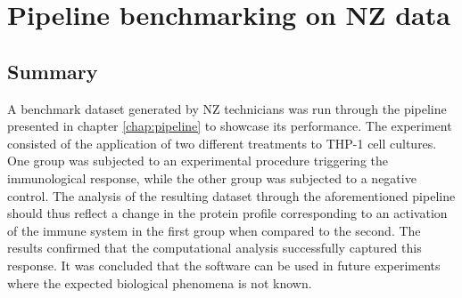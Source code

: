 \documentclass[thesis]{subfiles}
\begin{document}
\chapter{Pipeline benchmarking on \ac{NZ} data}
\label{chap:benchmark}

\section*{Summary}

A benchmark dataset generated by \ac{NZ} technicians was run through the pipeline presented in chapter \ref{chap:pipeline} to showcase its performance. The experiment consisted of the application of two different treatments to THP-1 cell cultures. One group was subjected to an experimental procedure triggering the immunological response, while the other group was subjected to a negative control. The analysis of the resulting dataset through the aforementioned pipeline should thus reflect a change in the protein profile corresponding to an activation of the immune system in the first group when compared to the second. The results confirmed that the computational analysis successfully captured this response. It was concluded that the software can be used in future experiments where the expected biological phenomena is not known.
\end{document}
